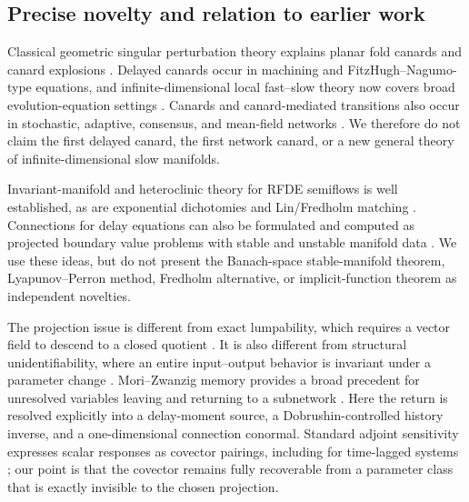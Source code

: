 \subsection{Precise novelty and relation to earlier work}

Classical geometric singular perturbation theory explains planar fold
canards and canard explosions
\citep{krupa2001relaxation,krupa2001extending}.  Delayed canards occur in
machining and FitzHugh--Nagumo-type equations, and infinite-dimensional local
fast--slow theory now covers broad evolution-equation settings
\citep{campbell2009delay,krupa2016complex,krupa2016explosion,%
avitabile2020local,hummel2022slow}.  Canards and canard-mediated transitions
also occur in stochastic, adaptive, consensus, and mean-field networks
\citep{touboul2015noise,ciszak2021collective,jardon2020consensus,%
qin2023tipping,balzer2024cascading}.  We therefore do not claim the first
delayed canard, the first network canard, or a new general theory of
infinite-dimensional slow manifolds.

Invariant-manifold and heteroclinic theory for RFDE semiflows is well
established, as are exponential dichotomies and Lin/Fredholm matching
\citep{hale1986heteroclinic,lin1986exponential,magalhaes1987persistence,%
bates1998invariant,malletparet1999fredholm,hupkes2009lin}.  Connections for
delay equations can also be formulated and computed as projected boundary
value problems with stable and unstable manifold data
\citep{henot2023homoclinic}.  We use these ideas, but do not present the
Banach-space stable-manifold theorem, Lyapunov--Perron method, Fredholm
alternative, or implicit-function theorem as independent novelties.

The projection issue is different from exact lumpability, which requires a
vector field to descend to a closed quotient
\citep{horstmeyer2016lumpability}.  It is also different from structural
unidentifiability, where an entire input--output behavior is invariant under a
parameter change
\citep{bearup2013inputoutput,villaverde2017dynamical}.  Mori--Zwanzig memory
provides a broad precedent for unresolved variables leaving and returning to a
subnetwork
\citep{chorin2002optimal,herrera2018memory,herrera2020tractable}.  Here the
return is resolved explicitly into a delay-moment source, a
Dobrushin-controlled history inverse, and a one-dimensional connection
conormal.  Standard adjoint sensitivity expresses scalar responses as
covector pairings, including for time-lagged systems
\citep{cacuci1981sensitivity,rihan2003sensitivity}; our point is that the
covector remains fully recoverable from a parameter class that is exactly
invisible to the chosen projection.

